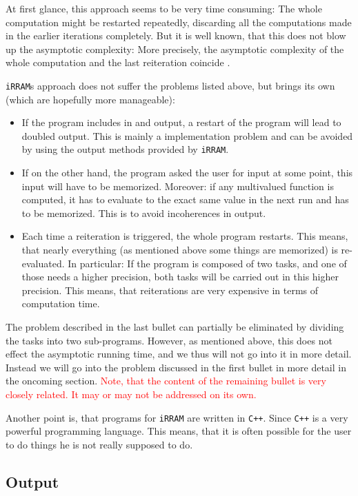 \documentclass{article}
\newcommand{\irram}{\texttt{iRRAM}\xspace}
\newcommand{\irrams}{\texttt{iRRAM}s\xspace}
\newcommand{\cc}{\texttt{C++}\xspace}
\newcommand{\temp}[1]{\textcolor{red}{#1}}
\begin{document}
At first glance, this approach seems to be very time consuming: The whole computation might be restarted repeatedly, discarding all the computations made in the earlier iterations completely. But it is well known, that this does not blow up the asymptotic complexity: More precisely, the asymptotic complexity of the whole computation and the last reiteration coincide \cite{}.

\irrams approach does not suffer the problems listed above, but brings its own (which are hopefully more manageable):
\begin{itemize}
\item If the program includes in and output, a restart of the program will lead to doubled output. This is mainly a implementation problem and can be avoided by using the output methods provided by \irram.
\item If on the other hand, the program asked the user for input at some point, this input will have to be memorized. Moreover: if any multivalued function is computed, it has to evaluate to the exact same value in the next run and has to be memorized. This is to avoid incoherences in output.
\item Each time a reiteration is triggered, the whole program restarts. This means, that nearly everything (as mentioned above some things are memorized) is re-evaluated. In particular: If the program is composed of two tasks, and one of those needs a higher precision, both tasks will be carried out in this higher precision. This means, that reiterations are very expensive in terms of computation time.
\end{itemize}

The problem described in the last bullet can partially be eliminated by dividing the tasks into two sub-programs. However, as mentioned above, this does not effect the asymptotic running time, and we thus will not go into it in more detail. Instead we will go into the problem discussed in the first bullet in more detail in the oncoming section. \temp{Note, that the content of the remaining bullet is very closely related. It may or may not be addressed on its own.}

Another point is, that programs for \irram are written in \cc. Since \cc is a very powerful programming language. This means, that it is often possible for the user to do things he is not really supposed to do.

\subsection{Output}
\end{document}

